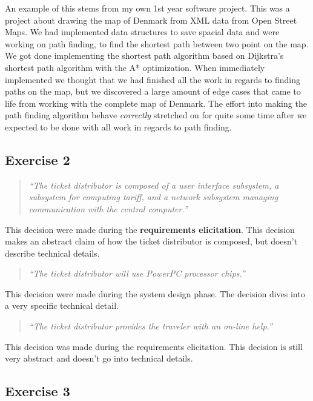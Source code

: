 \documentclass[12pt,letterpaper]{article}
\begin{document}
An example of this stems from my own 1st year software project. This was a project about
drawing the map of Denmark from XML data from Open Street Maps. We had implemented data structures
to save spacial data and were working on path finding, to find the shortest path between two
point on the map. We got done implementing the shortest path algorithm based on 
Dijkstra's shortest path algorithm with the A* optimization. When immediately implemented 
we thought that we had finished all the work in regards to finding paths on the map, but we
discovered a large amount of edge cases that came to life from working with the complete
map of Denmark. The effort into making the path finding algorithm behave \textit{correctly}
stretched on for quite some time after we expected to be done with all work in regards to path finding.

\subsection{Exercise 2}

\begin{quote}
  \textit{“The ticket distributor is composed of a user interface subsystem, a subsystem for computing tariff, and a network subsystem managing communication with the central computer.”}
\end{quote}

This decision were made during the \textbf{requirements elicitation}. This decision makes
an abstract claim of how the ticket distributor is composed, but doesn't describe technical details.

\begin{quote}
  \textit{“The ticket distributor will use PowerPC processor chips.”}
\end{quote}

This decision were made during the system design phase. The decision dives into a very
specific technical detail. 

\begin{quote}
  \textit{“The ticket distributor provides the traveler with an on-line help.”}
\end{quote}

This decision was made during the requirements elicitation. This decision is still very abstract
and doesn't go into technical details.

\subsection{Exercise 3}
\end{document}
